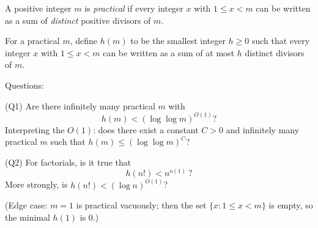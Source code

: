 A positive integer $m$ is \emph{practical} if every integer $x$ with $1\le x<m$ can be written as a sum of \emph{distinct} positive divisors of $m$.

For a practical $m$, define $h(m)$ to be the smallest integer $h\ge 0$ such that every integer $x$ with $1\le x<m$ can be written as a sum of at most $h$ distinct divisors of $m$.

Questions:

(Q1) Are there infinitely many practical $m$ with
\[
h(m) < (\log\log m)^{O(1)}?
\]
Interpreting the $O(1)$: does there exist a constant $C>0$ and infinitely many practical $m$ such that $h(m)\le (\log\log m)^C$?

(Q2) For factorials, is it true that
\[
h(n!) < n^{o(1)}\ ?
\]
More strongly, is $h(n!)<(\log n)^{O(1)}$?

(Edge case: $m=1$ is practical vacuously; then the set $\{x:1\le x<m\}$ is empty, so the minimal $h(1)$ is $0$.)
